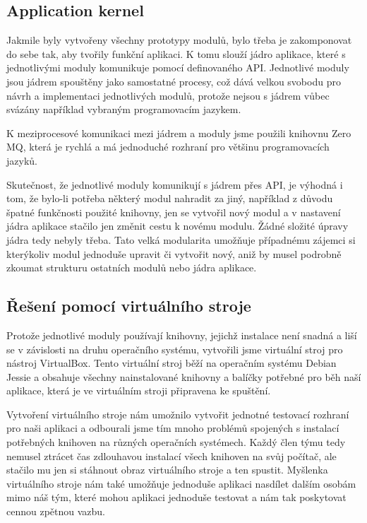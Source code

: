 \documentclass[12pt,a4paper]{article}
\begin{document}
\subsection*{Application kernel}
Jakmile byly vytvořeny všechny prototypy modulů, bylo třeba je zakomponovat do sebe tak, aby tvořily funkční aplikaci. K tomu slouží jádro aplikace, které s jednotlivými moduly komunikuje pomocí definovaného API. Jednotlivé moduly jsou jádrem spouštěny jako samostatné procesy, což dává velkou svobodu pro návrh a implementaci jednotlivých modulů, protože nejsou s jádrem vůbec svázány například vybraným programovacím jazykem.

K meziprocesové komunikaci mezi jádrem a moduly jsme použili knihovnu Zero MQ, která je rychlá a má jednoduché rozhraní pro většinu programovacích jazyků.

Skutečnost, že jednotlivé moduly komunikují s jádrem přes API, je výhodná i tom, že bylo-li potřeba některý modul nahradit za jiný, například z důvodu špatné funkčnosti použité knihovny, jen se vytvořil nový modul a v nastavení jádra aplikace stačilo jen změnit cestu k novému modulu. Žádné složité úpravy jádra tedy nebyly třeba. Tato velká modularita umožňuje případnému zájemci si kterýkoliv modul jednoduše upravit či vytvořit nový, aniž by musel podrobně zkoumat strukturu ostatních modulů nebo jádra aplikace.

\subsection*{Řešení pomocí virtuálního stroje}
Protože jednotlivé moduly používají knihovny, jejichž instalace není snadná a liší se v závislosti na druhu operačního systému, vytvořili jsme virtuální stroj pro nástroj VirtualBox. Tento virtuální stroj běží na operačním systému Debian Jessie a obsahuje všechny nainstalované knihovny a balíčky potřebné pro běh naší aplikace, která je ve virtuálním stroji připravena ke spuštění. 

Vytvoření virtuálního stroje nám umožnilo vytvořit jednotné testovací rozhraní pro naši aplikaci a odbourali jsme tím mnoho problémů spojených s instalací potřebných knihoven na různých operačních systémech. Každý člen týmu tedy nemusel ztrácet čas zdlouhavou instalací všech knihoven na svůj počítač, ale stačilo mu jen si stáhnout obraz virtuálního stroje a ten spustit. Myšlenka virtuálního stroje nám také umožňuje jednoduše aplikaci nasdílet dalším osobám mimo náš tým, které mohou aplikaci jednoduše testovat a nám tak poskytovat cennou zpětnou vazbu.
\end{document}
